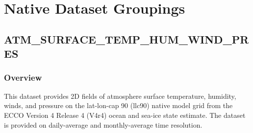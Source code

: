 \section{Native Dataset Groupings}
\subsection{ATM\_SURFACE\_TEMP\_HUM\_WIND\_PRES}
\subsubsection{Overview}
\newp
This dataset provides 2D fields of atmosphere surface temperature, humidity, winds, and pressure on the lat-lon-cap 90 (llc90) native model grid from the ECCO Version 4 Release 4 (V4r4) ocean and sea-ice state estimate. The dataset is provided on daily-average and monthly-average time resolution.
\\\\
